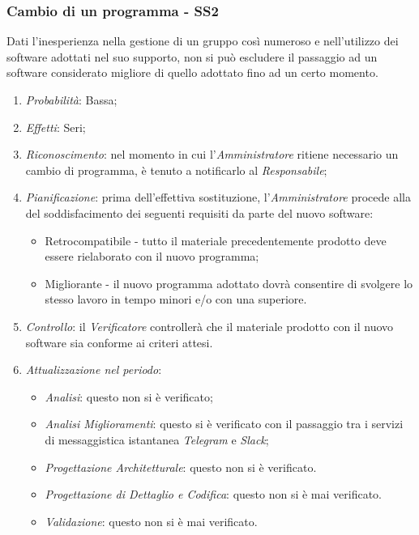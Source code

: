 \subsubsection{Cambio di un programma - SS2}
Dati l'inesperienza nella gestione di un gruppo cos\`i numeroso e nell'utilizzo dei software adottati nel suo supporto, non si pu\`o escludere il passaggio ad un software considerato migliore di quello adottato fino ad un certo momento.
\begin{enumerate}
\item \textit{Probabilit\`a}: Bassa;
\item \textit{Effetti}: Seri;
\item \textit{Riconoscimento}: nel momento in cui l'\textit{Amministratore} ritiene necessario un cambio di programma, è tenuto a notificarlo al \textit{Responsabile};
\item \textit{Pianificazione}: prima dell'effettiva sostituzione, l'\textit{Amministratore} procede alla  del soddisfacimento dei seguenti requisiti da parte del nuovo software:
  \begin{itemize}
    \item Retrocompatibile - tutto il materiale precedentemente prodotto deve essere rielaborato con il nuovo programma;
    \item Migliorante - il nuovo programma adottato dovr\`a consentire di svolgere lo stesso lavoro in tempo minori e/o con una  superiore.
  \end{itemize}
\item \textit{Controllo}: il \textit{Verificatore} controller\`a che il materiale prodotto con il nuovo software sia conforme ai criteri attesi.
\item \textit{Attualizzazione nel periodo}: 
	\begin{itemize}
	\item \textit{Analisi}: questo  non si è verificato;
	\item \textit{Analisi Miglioramenti}: questo  si è verificato con il passaggio tra i servizi di messaggistica istantanea \textit{Telegram} e \textit{Slack};
	\item \textit{Progettazione Architetturale}: questo  non si è verificato.
	\item \textit{Progettazione di Dettaglio e Codifica}: questo  non si è mai verificato.
	\item \textit{Validazione}: questo  non si è mai verificato.
	\end{itemize}
\end{enumerate}


